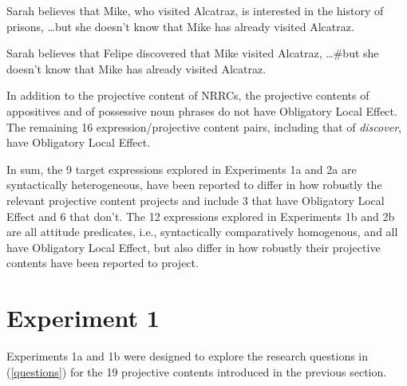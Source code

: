 \documentclass[11pt,fleqn]{article}
\newcommand{\6}{\mbox{$[\hspace*{-.6mm}[$}}
\newcommand{\9}{\mbox{$]\hspace*{-.6mm}]$}}
\begin{document}
\begin{exe}
\ex\label{ole}
\begin{xlist}
\ex Sarah believes that Mike, who visited Alcatraz, is interested in the history of prisons, \ldots but she doesn't know that Mike has already visited Alcatraz.

\ex Sarah believes that Felipe discovered that Mike visited Alcatraz, \ldots \#but she doesn't know that Mike has already visited Alcatraz. 

\end{xlist}
\end{exe}
In addition to the projective content of NRRCs, the projective contents of appositives and of possessive noun phrases do not have Obligatory Local Effect. The remaining 16 expression/projective content pairs, including that of {\em discover}, have Obligatory Local Effect. 

In sum, the 9 target expressions explored in Experiments 1a and 2a are syntactically heterogeneous, have been reported to differ in how robustly the relevant projective content projects and include 3 that have Obligatory Local Effect and 6 that don't. The 12 expressions explored in Experiments 1b and 2b are all attitude predicates, i.e., syntactically comparatively homogenous, and all have Obligatory Local Effect, but also differ in how robustly their projective contents have been reported to project.


\section{Experiment 1}
\label{s3}

Experiments 1a and 1b were designed to explore the research questions in (\ref{questions}) for the 19 projective contents introduced in the previous section.
\end{document}
